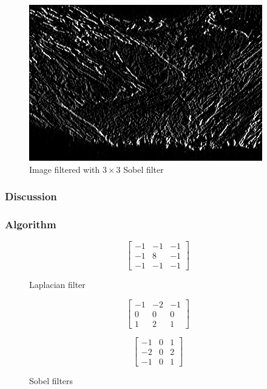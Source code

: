 \documentclass{article}
\begin{document}
\begin{figure}[H]
	\centering
	\includegraphics[width=288pt]{../result/filter-sobel-1.png}
	\caption{Image filtered with $3 \times 3$ Sobel filter}
\end{figure}

\subsubsection{Discussion}

\subsubsection{Algorithm}
\begin{figure}[H]
	\centering
		\[ \begin{bmatrix}
			-1 & -1 & -1 \\
			-1 &  8 & -1 \\
			-1 & -1 & -1
		\end{bmatrix} \]
\caption{Laplacian filter}
\end{figure}

\begin{figure}[H]
	\centering
	\begin{minipage}[b]{0.20\linewidth}
		\[ \begin{bmatrix}
			-1 & -2 & -1 \\
			 0 &  0 &  0 \\
			 1 &  2 &  1
		\end{bmatrix} \]
		\end{minipage}
	\begin{minipage}[b]{0.20\linewidth}
		\[ \begin{bmatrix}
			-1 &  0 &  1 \\
		    -2 &  0 &  2 \\
			-1 &  0 &  1
		\end{bmatrix} \]
	\end{minipage}
	\caption{Sobel filters}
\end{figure}


\end{document}

